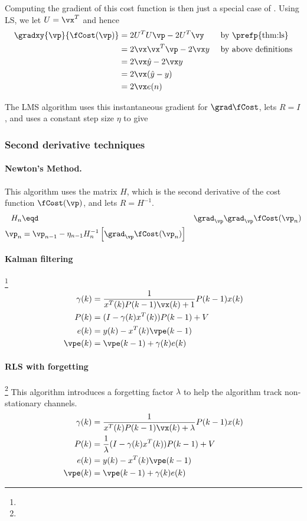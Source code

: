 Computing the gradient of this cost function is then
just a special case of  .
Using LS, we let $U=\vx^T$ and hence
\begin{align*}
   \gradxy{\vp}{\fCost(\vp)}
   &= 2U^TU \vp -2U^T\vy                   && \text{ by \prefp{thm:ls}}
\\ &= 2\vx\vx^T \vp -2\vx y               && \text{ by above definitions}
\\ &= 2\vx\hat{y} -2\vx y                    && \text{ }
\\ &= 2\vx(\hat{y} -y)                      && \text{ }
\\ &= 2\vx e(n)                && \text{ }
\end{align*}

The LMS algorithm uses this instantaneous gradient for $\grad\fCost$,
lets $R=I$, and uses a constant step size $\eta$ to give
\subsubsection*{Second derivative techniques}
\paragraph{Newton's Method.}
This algorithm uses the  matrix $H$,
which is the second derivative of the cost function $\fCost(\vp)$,
and lets $R=H^{-1}$.
\begin{align*}
   H_n &\eqd& \grad_\vp\grad_\vp \fCost(\vp_n)
\\
   \vp_n &= \vp_{n-1} - \eta_{n-1} H_n^{-1} \left[\grad_\vp\fCost(\vp_n)\right]
\end{align*}


\paragraph{Kalman filtering}\footnote{}
\begin{align*}
   \gamma(k) &= \frac{1}{x^T(k)P(k-1)\vx(k)+1}P(k-1)x(k) \\
   P(k) &= (I-\gamma(k)x^T(k))P(k-1)+V \\
   e(k) &= y(k) - x^T(k)\vpe(k-1) \\
   \vpe(k) &= \vpe(k-1) + \gamma(k)e(k)
\end{align*}

\paragraph{RLS with forgetting}\footnote{}
This algorithm introduces a forgetting factor $\lambda$
to help the algorithm track non-stationary channels.
\begin{align*}
   \gamma(k) &= \frac{1}{x^T(k)P(k-1)\vx(k)+\lambda}  P(k-1)x(k) \\
   P(k) &= \frac{1}{\lambda}(I-\gamma(k)x^T(k))P(k-1)+V \\
   e(k) &= y(k) - x^T(k)\vpe(k-1) \\
   \vpe(k) &= \vpe(k-1) + \gamma(k)e(k)
\end{align*}
\fi

